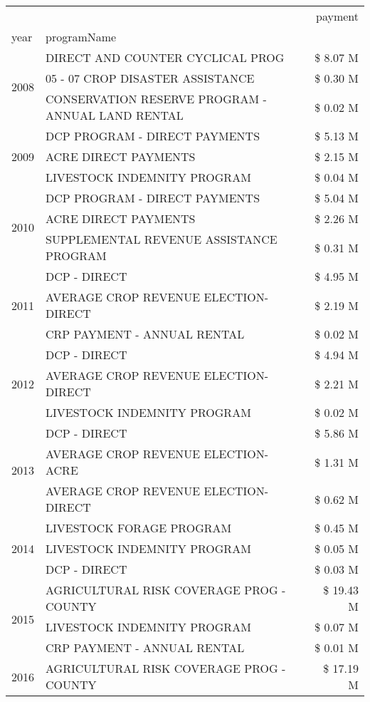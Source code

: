 \begin{tabular}{llr}
\toprule
 &  & payment \\
year & programName &  \\
\midrule
\multirow[t]{3}{*}{2008} & DIRECT AND COUNTER CYCLICAL PROG & \$ 8.07 M \\
 & 05 - 07 CROP DISASTER ASSISTANCE & \$ 0.30 M \\
 & CONSERVATION RESERVE PROGRAM - ANNUAL LAND RENTAL & \$ 0.02 M \\
\cline{1-3}
\multirow[t]{3}{*}{2009} & DCP PROGRAM - DIRECT PAYMENTS & \$ 5.13 M \\
 & ACRE DIRECT PAYMENTS & \$ 2.15 M \\
 & LIVESTOCK INDEMNITY PROGRAM & \$ 0.04 M \\
\cline{1-3}
\multirow[t]{3}{*}{2010} & DCP PROGRAM - DIRECT PAYMENTS & \$ 5.04 M \\
 & ACRE DIRECT PAYMENTS & \$ 2.26 M \\
 & SUPPLEMENTAL REVENUE ASSISTANCE PROGRAM & \$ 0.31 M \\
\cline{1-3}
\multirow[t]{3}{*}{2011} & DCP - DIRECT & \$ 4.95 M \\
 & AVERAGE CROP REVENUE ELECTION-DIRECT & \$ 2.19 M \\
 & CRP PAYMENT - ANNUAL RENTAL & \$ 0.02 M \\
\cline{1-3}
\multirow[t]{3}{*}{2012} & DCP - DIRECT & \$ 4.94 M \\
 & AVERAGE CROP REVENUE ELECTION-DIRECT & \$ 2.21 M \\
 & LIVESTOCK INDEMNITY PROGRAM & \$ 0.02 M \\
\cline{1-3}
\multirow[t]{3}{*}{2013} & DCP - DIRECT & \$ 5.86 M \\
 & AVERAGE CROP REVENUE ELECTION-ACRE & \$ 1.31 M \\
 & AVERAGE CROP REVENUE ELECTION-DIRECT & \$ 0.62 M \\
\cline{1-3}
\multirow[t]{3}{*}{2014} & LIVESTOCK FORAGE PROGRAM & \$ 0.45 M \\
 & LIVESTOCK INDEMNITY PROGRAM & \$ 0.05 M \\
 & DCP - DIRECT & \$ 0.03 M \\
\cline{1-3}
\multirow[t]{3}{*}{2015} & AGRICULTURAL RISK COVERAGE PROG - COUNTY & \$ 19.43 M \\
 & LIVESTOCK INDEMNITY PROGRAM & \$ 0.07 M \\
 & CRP PAYMENT - ANNUAL RENTAL & \$ 0.01 M \\
\cline{1-3}
\multirow[t]{3}{*}{2016} & AGRICULTURAL RISK COVERAGE PROG - COUNTY & \$ 17.19 M \\

\end{tabular}
